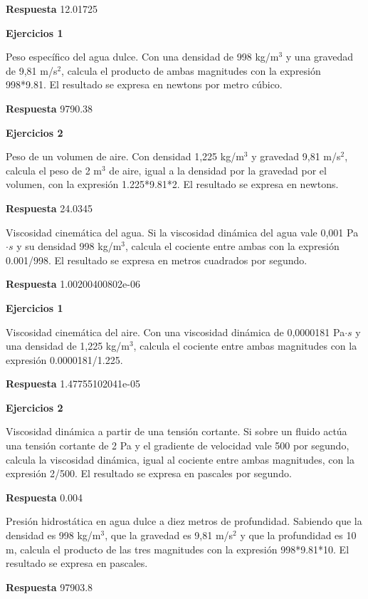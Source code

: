 \documentclass{book}
\begin{document}
\noindent\textbf{Respuesta} 12.01725

\noindent\textbf{Ejercicios 1}

Peso específico del agua dulce. Con una densidad de 998 kg/m\(^{3}\) y una gravedad de 9,81 m/s\(^{2}\), calcula el producto de ambas magnitudes con la expresión 998*9.81. El resultado se expresa en newtons por metro cúbico.

\noindent\textbf{Respuesta} 9790.38

\noindent\textbf{Ejercicios 2}

Peso de un volumen de aire. Con densidad 1,225 kg/m\(^{3}\) y gravedad 9,81 m/s\(^{2}\), calcula el peso de 2 m\(^{3}\) de aire, igual a la densidad por la gravedad por el volumen, con la expresión 1.225*9.81*2. El resultado se expresa en newtons.

\noindent\textbf{Respuesta} 24.0345

Viscosidad cinemática del agua. Si la viscosidad dinámica del agua vale 0,001 Pa\(\cdot s\) y su densidad 998 kg/m\(^{3}\), calcula el cociente entre ambas con la expresión 0.001/998. El resultado se expresa en metros cuadrados por segundo.

\noindent\textbf{Respuesta} 1.00200400802e-06

\noindent\textbf{Ejercicios 1}

Viscosidad cinemática del aire. Con una viscosidad dinámica de 0,0000181 Pa\(\cdot s\) y una densidad de 1,225 kg/m\(^{3}\), calcula el cociente entre ambas magnitudes con la expresión 0.0000181/1.225.

\noindent\textbf{Respuesta} 1.47755102041e-05

\noindent\textbf{Ejercicios 2}

Viscosidad dinámica a partir de una tensión cortante. Si sobre un fluido actúa una tensión cortante de 2 Pa y el gradiente de velocidad vale 500 por segundo, calcula la viscosidad dinámica, igual al cociente entre ambas magnitudes, con la expresión 2/500. El resultado se expresa en pascales por segundo.

\noindent\textbf{Respuesta} 0.004

Presión hidrostática en agua dulce a diez metros de profundidad. Sabiendo que la densidad es 998 kg/m\(^{3}\), que la gravedad es 9,81 m/s\(^{2}\) y que la profundidad es 10 m, calcula el producto de las tres magnitudes con la expresión 998*9.81*10. El resultado se expresa en pascales.

\noindent\textbf{Respuesta} 97903.8
\end{document}
